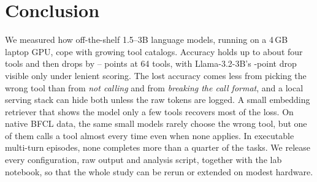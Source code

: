 \section{Conclusion}
\label{sec:conclusion}

We measured how off-the-shelf 1.5--3B language models, running on a 4\,GB laptop GPU, cope with growing tool catalogs.
Accuracy holds up to about four tools and then drops by \DropQwenThreeFive--\DropQwenThree{} points at 64 tools, with Llama-3.2-3B's \LenDropLlama-point drop visible only under lenient scoring.
The lost accuracy comes less from picking the wrong tool than from \emph{not calling} and from \emph{breaking the call format}, and a local serving stack can hide both unless the raw tokens are logged.
A small embedding retriever that shows the model only a few tools recovers most of the loss.
On native BFCL data, the same small models rarely choose the wrong tool, but one of them calls a tool almost every time even when none applies. In executable multi-turn episodes, none completes more than a quarter of the tasks.
We release every configuration, raw output and analysis script, together with the lab notebook, so that the whole study can be rerun or extended on modest hardware.

